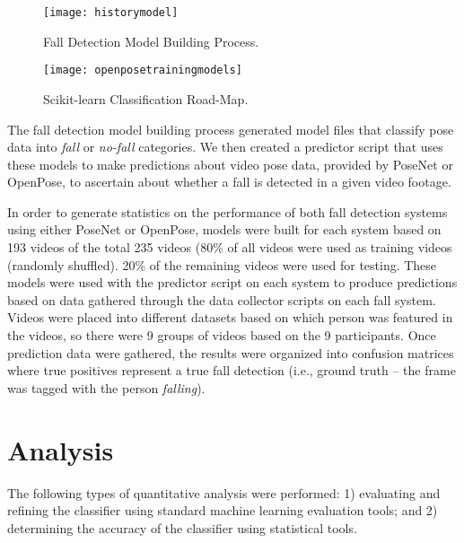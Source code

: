 \begin{figure}
  \texttt{[image: historymodel]}
  \caption{Fall Detection Model Building Process.}
  \label{fig:historymodel}
\end{figure}



\begin{figure}
  \texttt{[image: openposetrainingmodels]}
  \caption{Scikit-learn Classification Road-Map.}
  \label{fig:openposetrainingmodels}
\end{figure}


The fall detection model building process generated model files that classify pose data into \textit{fall} or \textit{no-fall} categories. We then created a predictor script that uses these models to make predictions about video pose data, provided by PoseNet or OpenPose, to ascertain about whether a fall is detected in a given video footage.


In order to generate statistics on the performance of both fall detection systems using either PoseNet or OpenPose, models were built for each system based on 193 videos of the total 235 videos (80\% of all videos were used as training videos (randomly shuffled). 20\% of the remaining videos were used for testing.  These models were used with the predictor script on each system to produce predictions based on data gathered through the data collector scripts on each fall system. Videos were placed into different datasets based on which person was featured in the videos, so there were 9 groups of videos based on the 9 participants. Once prediction data were gathered, the results were organized into confusion matrices where true positives represent a true fall detection (i.e., ground truth – the frame was tagged with the person \textit{falling}).



\section{Analysis}

The following types of quantitative analysis were performed: 1) evaluating and refining the classifier using standard machine learning evaluation tools; and 2) determining the accuracy of the classifier using statistical tools.


